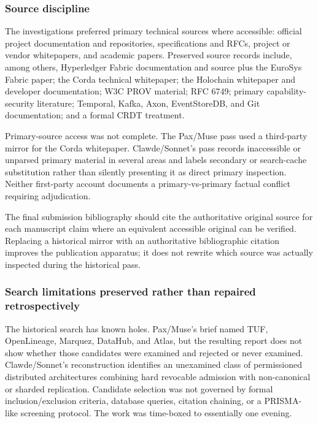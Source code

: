 \documentclass[11pt]{article}
\begin{document}
\subsubsection{Source discipline}

The investigations preferred primary technical sources where accessible: official project documentation and repositories, specifications and RFCs, project or vendor whitepapers, and academic papers. Preserved source records include, among others, Hyperledger Fabric documentation and source plus the EuroSys Fabric paper; the Corda technical whitepaper; the Holochain whitepaper and developer documentation; W3C PROV material; RFC 6749; primary capability-security literature; Temporal, Kafka, Axon, EventStoreDB, and Git documentation; and a formal CRDT treatment.

Primary-source access was not complete. The Pax/Muse pass used a third-party mirror for the Corda whitepaper. Clawde/Sonnet's pass records inaccessible or unparsed primary material in several areas and labels secondary or search-cache substitution rather than silently presenting it as direct primary inspection. Neither first-party account documents a primary-vs-primary factual conflict requiring adjudication.

The final submission bibliography should cite the authoritative original source for each manuscript claim where an equivalent accessible original can be verified. Replacing a historical mirror with an authoritative bibliographic citation improves the publication apparatus; it does not rewrite which source was actually inspected during the historical pass.

\subsubsection{Search limitations preserved rather than repaired retrospectively}

The historical search has known holes. Pax/Muse's brief named TUF, OpenLineage, Marquez, DataHub, and Atlas, but the resulting report does not show whether those candidates were examined and rejected or never examined. Clawde/Sonnet's reconstruction identifies an unexamined class of permissioned distributed architectures combining hard revocable admission with non-canonical or sharded replication. Candidate selection was not governed by formal inclusion/exclusion criteria, database queries, citation chaining, or a PRISMA-like screening protocol. The work was time-boxed to essentially one evening.
\end{document}
